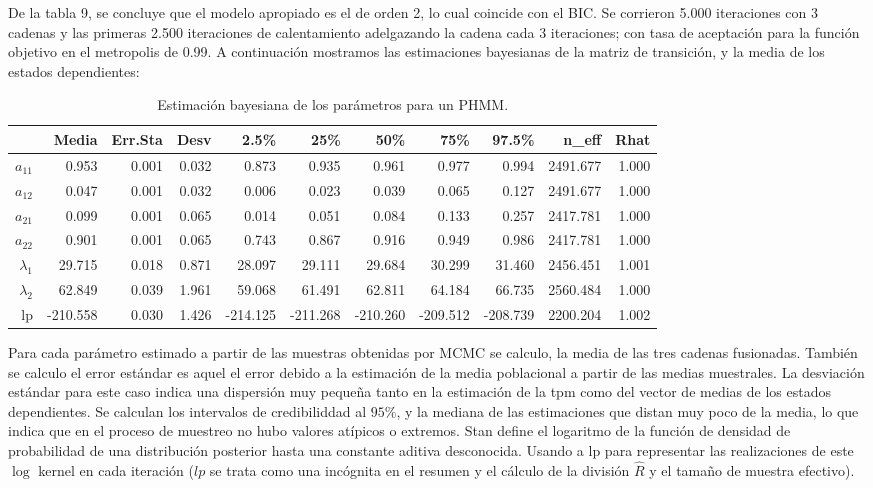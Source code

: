 \documentclass[a4paper]{article}\usepackage[]{graphicx}\usepackage[]{color}
\begin{document}
De la tabla 9, se concluye que el modelo apropiado es el de orden 2, lo cual coincide con el BIC. Se corrieron 5.000 iteraciones con 3 cadenas y las primeras 2.500 iteraciones de calentamiento adelgazando la cadena cada 3 iteraciones; con tasa de aceptación para la función objetivo en el metropolis de 0.99. A continuación mostramos las estimaciones bayesianas de la matriz de transición, y la media de los estados dependientes:

\begin{table}[ht]
\centering
\begin{tabular}{rrrrrrrrrrr}
  \hline
 & Media & Err.Sta & Desv & 2.5\% & 25\% & 50\% & 75\% & 97.5\% & n\_eff & Rhat \\ 
  \hline
$a_{11}$ & 0.953 & 0.001 & 0.032 & 0.873 & 0.935 & 0.961 & 0.977 & 0.994 & 2491.677 & 1.000 \\ 
  $a_{12}$ & 0.047 & 0.001 & 0.032 & 0.006 & 0.023 & 0.039 & 0.065 & 0.127 & 2491.677 & 1.000 \\ 
  $a_{21}$ & 0.099 & 0.001 & 0.065 & 0.014 & 0.051 & 0.084 & 0.133 & 0.257 & 2417.781 & 1.000 \\ 
  $a_{22}$ & 0.901 & 0.001 & 0.065 & 0.743 & 0.867 & 0.916 & 0.949 & 0.986 & 2417.781 & 1.000 \\ 
  $\lambda_1$ & 29.715 & 0.018 & 0.871 & 28.097 & 29.111 & 29.684 & 30.299 & 31.460 & 2456.451 & 1.001 \\ 
  $\lambda_2$ & 62.849 & 0.039 & 1.961 & 59.068 & 61.491 & 62.811 & 64.184 & 66.735 & 2560.484 & 1.000 \\ 
  lp & -210.558 & 0.030 & 1.426 & -214.125 & -211.268 & -210.260 & -209.512 & -208.739 & 2200.204 & 1.002 \\ 
   \hline
\end{tabular}
\caption{Estimación bayesiana de los parámetros para un PHMM.} 
\end{table}


Para cada parámetro estimado a partir de las muestras obtenidas por MCMC se calculo, la media de las tres cadenas fusionadas. También se calculo el error estándar es aquel el error debido a la estimación de la media poblacional a partir de las medias muestrales. La desviación estándar para este caso indica una dispersión muy pequeña tanto en la estimación de la tpm como del vector de medias de los estados dependientes. Se calculan los intervalos de credibiliddad al $95 \%$, y la mediana de las estimaciones que distan muy poco de la media, lo que indica que en el proceso de muestreo no hubo valores atípicos o extremos.
Stan define el logaritmo de la función de densidad de probabilidad de una distribución posterior hasta una constante aditiva desconocida. Usando a lp para representar las realizaciones de este $\log$ kernel en cada iteración ($lp$ se trata como una incógnita en el resumen y el cálculo de la división $\hat{R}$ y el tamaño de muestra efectivo).
\end{document}
